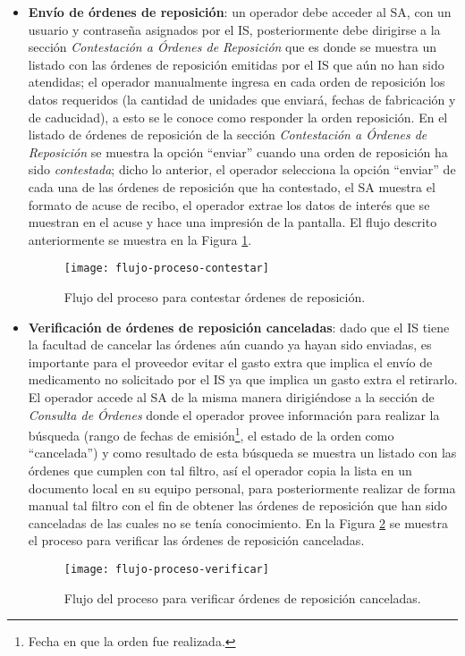 \begin{itemize}
\item \textbf{Envío de órdenes de reposición}: un operador debe acceder al SA, con un usuario y contraseña asignados por el IS, posteriormente debe dirigirse a la sección \textit{Contestación a Órdenes de Reposición} que es donde se muestra un listado con las órdenes de reposición emitidas por el IS que aún no han sido atendidas; el operador manualmente ingresa en cada orden de reposición los datos requeridos (la cantidad de unidades que enviará, fechas de fabricación y de caducidad), a esto se le conoce como responder la orden reposición. En el listado de órdenes de reposición de la sección \textit{Contestación a Órdenes de Reposición} se muestra la opción ``enviar'' cuando una orden de reposición ha sido \textit{contestada}; dicho lo anterior, el operador selecciona la opción ``enviar'' de cada una de las órdenes de reposición que ha contestado, el SA muestra el formato de acuse de recibo, el operador extrae los datos de interés que se muestran en el acuse y hace una impresión de la pantalla. El flujo descrito anteriormente se muestra en la Figura \ref{fig:flow-proc-contestar}.

\begin{figure}[h]
\centering
\texttt{[image: flujo-proceso-contestar]} 
\caption{Flujo del proceso para contestar órdenes de reposición.}
\label{fig:flow-proc-contestar}
\end{figure}

\item \textbf{Verificación de órdenes de reposición canceladas}: dado que el IS tiene la facultad de cancelar las órdenes aún cuando ya hayan sido enviadas, es importante para el proveedor evitar el gasto extra que implica el envío de medicamento no solicitado por el IS ya que implica un gasto extra el retirarlo. El operador accede al SA de la misma manera dirigiéndose a la sección de \textit{Consulta de Órdenes} donde el operador provee información para realizar la búsqueda (rango de fechas de emisión\footnote{Fecha en que la orden fue realizada.}, el estado de la orden como ``cancelada'') y como resultado de esta búsqueda se muestra un listado con las órdenes que cumplen con tal filtro, así el operador copia la lista en un documento local en su equipo personal, para posteriormente realizar de forma manual tal filtro con el fin de obtener las órdenes de reposición que han sido canceladas de las cuales no se tenía conocimiento. En la Figura \ref{fig:flow-proc-verificar} se muestra el proceso para verificar las órdenes de reposición canceladas.
\begin{figure}[h]
\centering
\texttt{[image: flujo-proceso-verificar]} 
\caption{Flujo del proceso para verificar órdenes de reposición canceladas.}
\label{fig:flow-proc-verificar}
\end{figure}
\end{itemize}

